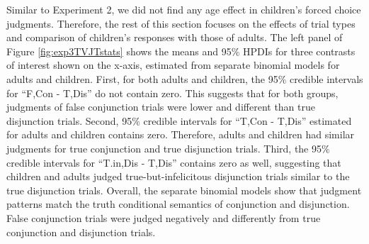\documentclass[
  english,
  ,man,floatsintext]{apa6}
\begin{document}
Similar to Experiment 2, we did not find any age effect in children's forced choice judgments. Therefore, the rest of this section focuses on the effects of trial types and comparison of children's responses with those of adults. The left panel of Figure \ref{fig:exp3TVJTstats} shows the means and 95\% HPDIs for three contrasts of interest shown on the x-axis, estimated from separate binomial models for adults and children. First, for both adults and children, the 95\% credible intervals for \enquote{F,Con - T,Dis} do not contain zero. This suggests that for both groups, judgments of false conjunction trials were lower and different than true disjunction trials. Second, 95\% credible intervals for \enquote{T,Con - T,Dis} estimated for adults and children contains zero. Therefore, adults and children had similar judgments for true conjunction and true disjunction trials. Third, the 95\% credible intervals for \enquote{T.in,Dis - T,Dis} contains zero as well, suggesting that children and adults judged true-but-infelicitous disjunction trials similar to the true disjunction trials. Overall, the separate binomial models show that judgment patterns match the truth conditional semantics of conjunction and disjunction. False conjunction trials were judged negatively and differently from true conjunction and disjunction trials.
\end{document}
